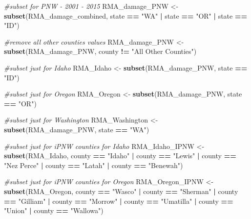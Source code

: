 \documentclass[]{article}
\newenvironment{Shaded}{\begin{snugshade}}{\end{snugshade}}
\newcommand{\CommentTok}[1]{\textcolor[rgb]{0.56,0.35,0.01}{\textit{#1}}}
\newcommand{\KeywordTok}[1]{\textcolor[rgb]{0.13,0.29,0.53}{\textbf{#1}}}
\newcommand{\NormalTok}[1]{#1}
\newcommand{\OperatorTok}[1]{\textcolor[rgb]{0.81,0.36,0.00}{\textbf{#1}}}
\newcommand{\StringTok}[1]{\textcolor[rgb]{0.31,0.60,0.02}{#1}}
\begin{document}
\begin{Shaded}
\begin{Highlighting}[]
\CommentTok{#subset for PNW - 2001 - 2015}
\NormalTok{RMA_damage_PNW <-}\StringTok{ }\KeywordTok{subset}\NormalTok{(RMA_damage_combined, state }\OperatorTok{==}\StringTok{ "WA"} \OperatorTok{|}\StringTok{ }\NormalTok{state }\OperatorTok{==}\StringTok{ "OR"} \OperatorTok{|}\StringTok{ }\NormalTok{state }\OperatorTok{==}\StringTok{ "ID"}\NormalTok{)}

\CommentTok{#remove all other counties values}
\NormalTok{RMA_damage_PNW <-}\StringTok{ }\KeywordTok{subset}\NormalTok{(RMA_damage_PNW, county }\OperatorTok{!=}\StringTok{ "All Other Counties"}\NormalTok{)}

\CommentTok{#subset just for Idaho}
\NormalTok{RMA_Idaho <-}\StringTok{ }\KeywordTok{subset}\NormalTok{(RMA_damage_PNW, state }\OperatorTok{==}\StringTok{ "ID"}\NormalTok{)}

\CommentTok{#subset just for Oregon}
\NormalTok{RMA_Oregon <-}\StringTok{ }\KeywordTok{subset}\NormalTok{(RMA_damage_PNW, state }\OperatorTok{==}\StringTok{ "OR"}\NormalTok{)}

\CommentTok{#subset just for Washington}
\NormalTok{RMA_Washington <-}\StringTok{ }\KeywordTok{subset}\NormalTok{(RMA_damage_PNW, state }\OperatorTok{==}\StringTok{ "WA"}\NormalTok{)}

\CommentTok{#subset just for iPNW counties for Idaho}
\NormalTok{RMA_Idaho_IPNW <-}\StringTok{ }\KeywordTok{subset}\NormalTok{(RMA_Idaho, county }\OperatorTok{==}\StringTok{ "Idaho"} \OperatorTok{|}\StringTok{ }\NormalTok{county }\OperatorTok{==}\StringTok{ "Lewis"} \OperatorTok{|}\StringTok{ }\NormalTok{county }\OperatorTok{==}\StringTok{  "Nez Perce"} \OperatorTok{|}\StringTok{ }\NormalTok{county }\OperatorTok{==}\StringTok{  "Latah"} \OperatorTok{|}\StringTok{ }\NormalTok{county }\OperatorTok{==}\StringTok{  "Benewah"}\NormalTok{)}

\CommentTok{#subset just for iPNW counties for Oregon}
\NormalTok{RMA_Oregon_IPNW <-}\StringTok{ }\KeywordTok{subset}\NormalTok{(RMA_Oregon, county }\OperatorTok{==}\StringTok{ "Wasco"} \OperatorTok{|}\StringTok{ }\NormalTok{county }\OperatorTok{==}\StringTok{  "Sherman"} \OperatorTok{|}\StringTok{ }\NormalTok{county }\OperatorTok{==}\StringTok{  "Gilliam"} \OperatorTok{|}\StringTok{ }\NormalTok{county }\OperatorTok{==}\StringTok{  "Morrow"} \OperatorTok{|}\StringTok{ }\NormalTok{county }\OperatorTok{==}\StringTok{  "Umatilla"} \OperatorTok{|}\StringTok{ }\NormalTok{county }\OperatorTok{==}\StringTok{  "Union"} \OperatorTok{|}\StringTok{ }\NormalTok{county }\OperatorTok{==}\StringTok{  "Wallowa"}\NormalTok{)}


\end{Highlighting}
\end{Shaded}
\end{document}
